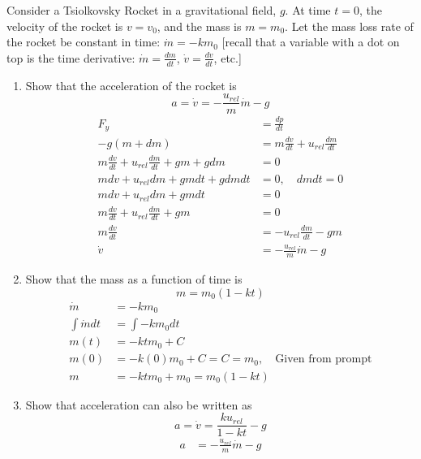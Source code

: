 \documentclass{article}
\begin{document}
Consider a Tsiolkovsky Rocket in a gravitational field, $ g $. At time $ t = 0 $, the velocity of the rocket is $ v = v_0 $, and the mass is $ m = m_0 $. Let the mass loss rate of the rocket be constant in time: $ \dot{m} = -km_0 $ [recall that a variable with a dot on top is the time derivative: $ \dot{m} = \frac{dm}{dt} $, $ \dot{v} = \frac{dv}{dt} $, etc.]
\begin{enumerate}[label = \textbf{\arabic*.}]
	\item Show that the acceleration of the rocket is
		\begin{equation*}
			a = \dot{v} = -\frac{u_{rel}}{m}\dot{m} - g
		\end{equation*}
		\begin{align*}
			F_y & = \frac{dp}{dt} \\
			-g(m + dm) & = m\frac{dv}{dt} + u_{rel}\frac{dm}{dt} \\
			m\frac{dv}{dt} + u_{rel}\frac{dm}{dt} + gm + gdm & = 0 \\
			mdv + u_{rel}dm + gmdt + gdmdt & = 0, \quad dmdt = 0 \\
			mdv + u_{rel}dm + gmdt & = 0 \\
			m\frac{dv}{dt} + u_{rel}\frac{dm}{dt} + gm & = 0 \\
			m\frac{dv}{dt} & = -u_{rel}\frac{dm}{dt} - gm \\
			\dot{v} & = -\frac{u_{rel}}{m}\dot{m} - g
		\end{align*}
	\item Show that the mass as a function of time is
		\begin{equation*}
			m = m_0(1 - kt)
		\end{equation*}
		\begin{align*}
			\dot{m} & = -km_0 \\
			\int \dot{m} dt & = \int -km_0 dt \\
			m(t) & = -ktm_0 + C \\
			m(0) & = -k(0)m_0 + C = C = m_0, \quad \text{Given from prompt} \\
			m & = -ktm_0 + m_0 = m_0(1 - kt)
		\end{align*}
	\item Show that acceleration can also be written as
		\begin{equation*}
			a = \dot{v} = \frac{ku_{rel}}{1 - kt} - g
		\end{equation*}
		\begin{align*}
			a & = -\frac{u_{rel}}{m}\dot{m} - g \\

\end{align*}
\end{enumerate}
\end{document}
